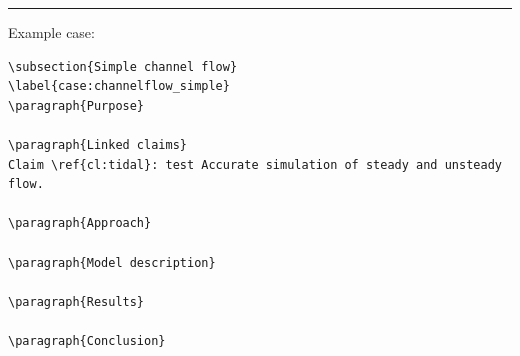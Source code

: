 \rule{\linewidth}{1pt}
Example case:
\begin{verbatim}
\subsection{Simple channel flow}
\label{case:channelflow_simple}
\paragraph{Purpose}

\paragraph{Linked claims}
Claim \ref{cl:tidal}: test Accurate simulation of steady and unsteady flow.

\paragraph{Approach}

\paragraph{Model description}

\paragraph{Results}

\paragraph{Conclusion}
\end{verbatim}

